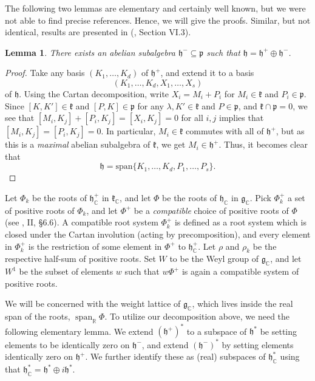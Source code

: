 \documentclass[11pt,reqno]{amsart}
\numberwithin{equation}{section}
\newtheorem{lem}[thm]{Lemma}
\theoremstyle{definition}
\theoremstyle{remark}
\renewcommand{\sp}{\operatorname{span}}
\newcommand{\mf}[1]{\mathfrak{#1}}
\newcommand{\C}{\mathbb{C}}
\newcommand{\R}{\mathbb{R}}
\renewcommand{\subset}{\subseteq}
\begin{document}
The following two lemmas are elementary and certainly well known, but we were not able to find precise references. Hence, we will give the proofs. Similar, but not identical, results are presented in (\cite{Helgason2}, Section VI.$3$).

\begin{lem}\label{decomp}
    There exists an abelian subalgebra $\mf{h}^-\subset \mf{p}$ such that $\mf{h}=\mf{h}^+\oplus \mf{h}^-$.
\end{lem}

\begin{proof}
    Take any basis $(K_1,\dots,K_d)$ of $\mf{h}^+$, and extend it to a basis 
    $$(K_1,\dots, K_d,X_1,\dots,X_s)$$
    of $\mf{h}$. Using the Cartan decomposition, write $X_i = M_i+P_i$ for $M_i\in \mf{k}$ and $P_i\in \mf{p}$. Since $[K,K']\in \mf{k}$ and $[P,K]\in \mf{p}$ for any $\lambda,K'\in\mf{k}$ and $P\in\mf{p}$, and $\mf{k}\cap \mf{p}=0$, we see that $[M_i,K_j]+[P_i,K_j] = [X_i,K_j]=0$ for all $i,j$ implies that $[M_i,K_j]=[P_i,K_j]=0$. In particular, $M_i\in \mf{k}$ commutes with all of $\mf{h}^+$, but as this is a \textit{maximal} abelian subalgebra of $\mf{k}$, we get $M_i\in \mf{h}^+$. Thus, it becomes clear that 
    $$\mf{h} = \text{span}\lbrace K_1,\dots, K_d,P_1,\dots,P_s\rbrace.$$
\end{proof}


\noindent Let $\Phi_k$ be the roots of $\mf{h}^+_\C$ in $\mf{k}_\C$, and let $\Phi$ be the roots of $\mf{h}_\C$ in $\mf{g}_\C$. Pick $\Phi^+_k$ a set of positive roots of $\Phi_k$, and let $\Phi^+$ be a \textit{compatible} choice of positive roots of $\Phi$ (see \cite{BW}, II, §$6.6$). A compatible root system $\Phi^+_k$ is defined as a root system which is closed under the Cartan involution (acting by precomposition), and every element in $\Phi^+_k$ is the restriction of some element in $\Phi^+$ to $\mf{h}^+_\C$. Let $\rho$ and $\rho_k$ be the respective half-sum of positive roots. Set $W$ to be the Weyl group of $\mf{g}_\C$, and let $W^1$ be the subset of elements $w$ such that $w\Phi^+$ is again a compatible system of positive roots.

We will be concerned with the weight lattice of $\mf{g}_\C$, which lives inside the real span of the roots, $\sp_\R \Phi$. To utilize our decomposition above, we need the following elementary lemma. We extend $(\mf{h}^+)^*$ to a subspace of $\mf{h}^*$ be setting elements to be identically zero on $\mf{h}^-$, and extend $(\mf{h}^-)^*$ by setting elements identically zero on $\mf{h}^+$. We further identify these as (real) subspaces of $\mf{h}^*_\C$ using that $\mf{h}^*_\C= \mf{h}^*\oplus i\mf{h}^*$. 
\end{document}
